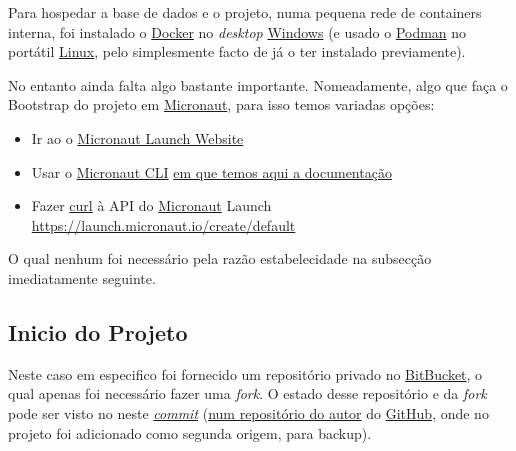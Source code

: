 Para hospedar a base de dados e o projeto, numa pequena rede de containers interna, foi instalado o \href{https://www.docker.com/}{Docker} no \textit{desktop} \href{https://www.microsoft.com/pt-pt/software-download/windows10}{Windows} (e usado o \href{https://podman.io/}{Podman} no portátil \href{https://archlinux.org/download/}{Linux}, pelo simplesmente facto de já o ter instalado previamente).

No entanto ainda falta algo bastante importante. Nomeadamente, algo que faça o Bootstrap do projeto em \href{https://micronaut.io/}{Micronaut}, para isso temos variadas opções:

\begin{itemize}
  \item Ir ao o \href{https://micronaut.io/launch}{Micronaut Launch Website}
  \item Usar o \href{https://micronaut.io/download/}{Micronaut CLI} \href{https://micronaut-projects.github.io/micronaut-starter/latest/guide/index.html}{em que temos aqui a documentação}
  \item Fazer \href{https://curl.se/}{curl} à API do \href{https://micronaut.io/}{Micronaut} Launch \href{https://launch.micronaut.io/create/default/com.optiply.project.webshop?lang=JAVA&build=GRADLE&test=JUNIT&javaVersion=JDK_17&features=jackson-databind&features=kubernetes-reactor-client&features=properties&features=flyway&features=jdbc-hikari&features=jooq&features=postgres&features=r2dbc&features=testcontainers&features=lombok&features=mockito&features=openrewrite&features=asciidoctor&features=logback&features=reactor&features=security-jwt&features=problem-json&features=jackson-xml}{https://launch.micronaut.io/create/default}
\end{itemize}

O qual nenhum foi necessário pela razão estabelecidade na subsecção imediatamente seguinte.

\subsection{Inicio do Projeto}

Neste caso em especifico foi fornecido um repositório privado no \href{https://bitbucket.org/}{BitBucket}, o qual apenas foi necessário fazer uma \textit{fork}. O estado desse repositório e da \textit{fork} pode ser visto no neste \href{https://github.com/CatKinKitKat/MicronautJooqPostgresREST/tree/07d359ce933dde634f176dc95bf5ac1b3e4bc93d}{\textit{commit}} (\href{https://github.com/CatKinKitKat/MicronautJooqPostgresREST}{num repositório do autor} do \href{https://github.com/}{GitHub}, onde no projeto foi adicionado como segunda origem, para backup).

